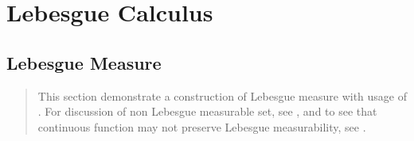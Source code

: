 \documentclass{report}
\begin{document}
\chapter{Lebesgue Calculus}
\section{Lebesgue Measure}
\begin{abstract}
This section demonstrate a construction of Lebesgue measure with usage of . For discussion of non Lebesgue measurable set, see , and to see that continuous function may not preserve Lebesgue measurability, see .  
\end{abstract}
\end{document}
